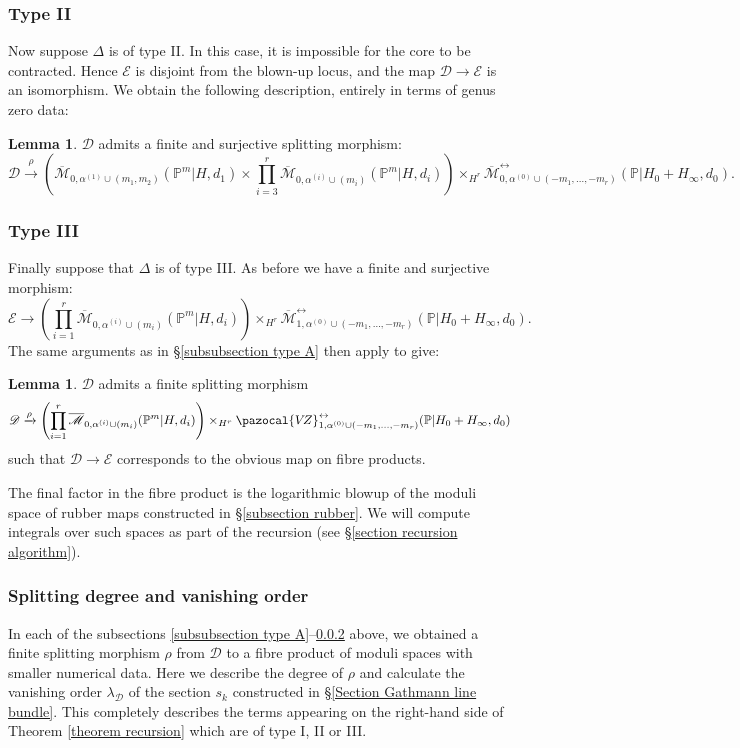 \documentclass[11pt]{amsart}
\newcommand{\PP}{\mathbb P}
\newcommand{\VZ}{\pazocal{V\!Z}}
\renewcommand{\to}{\rightarrow}
\newcommand{\Mcal}{\mathcal{M}}
\newcommand{\Dcal}{\mathcal{D}}
\newcommand{\Ecal}{\mathcal{E}}
\newcommand{\ol}[1]{\overline{#1}}
\theoremstyle{definition}
\newtheorem{lemma}[thm]{Lemma}
\theoremstyle{definition}
\begin{document}
\subsubsection{Type II}
Now suppose $\Delta$ is of type II. In this case, it is impossible for the core to be contracted. Hence $\Ecal$ is disjoint from the blown-up locus, and the map $\Dcal \to \Ecal$ is an isomorphism. We obtain the following description, entirely in terms of genus zero data:
\begin{lemma} $\Dcal$ admits a finite and surjective splitting morphism:
\begin{equation*} \Dcal \xrightarrow{\rho} \left(\ol\Mcal_{0,\alpha^{(1)}\cup(m_1,m_2)}(\PP^m|H,d_1)\times\prod_{i=3}^r \ol\Mcal_{0,\alpha^{(i)}\cup(m_i)}(\PP^m|H,d_i)\right) \times_{H^r} \ol\Mcal^{\leftrightarrow}_{0,\alpha^{(0)}\cup(-m_1,\ldots,-m_r)}(\mathbb P|H_0+H_\infty,d_0).\end{equation*}\end{lemma}

\subsubsection{Type III} \label{subsubsection type C+} Finally suppose that $\Delta$ is of type III. As before we have a finite and surjective morphism:
\begin{equation*} \Ecal \to  \left( \prod_{i=1}^r \ol\Mcal_{0,\alpha^{(i)}\cup(m_i)}(\PP^m|H,d_i) \right) \times_{H^r} \ol\Mcal^{\leftrightarrow}_{1,\alpha^{(0)}\cup(-m_1,\ldots,-m_r)}(\mathbb{P}|H_0+H_\infty,d_0). \end{equation*}
The same arguments as in \S \ref{subsubsection type A} then apply to give:
\begin{lemma} $\Dcal$ admits a finite splitting morphism
\begin{equation*}\Dcal \xrightarrow{\rho} \left( \prod_{i=1}^r \ol\Mcal_{0,\alpha^{(i)}\cup(m_i)}(\PP^m|H,d_i) \right) \times_{H^r} \VZ^{\leftrightarrow}_{1,\alpha^{(0)}\cup(-m_1,\ldots,-m_r)}(\mathbb{P}|H_0+H_\infty,d_0)\end{equation*}
such that $\Dcal \to \Ecal$ corresponds to the obvious map on fibre products.\end{lemma}
\noindent The final factor in the fibre product is the logarithmic blowup of the moduli space of rubber maps constructed in \S \ref{subsection rubber}. We will compute integrals over such spaces as part of the recursion (see \S \ref{section recursion algorithm}).

\subsubsection{Splitting degree and vanishing order} \label{subsubsection splitting degree} In each of the subsections \ref{subsubsection type A}--\ref{subsubsection type C+} above, we obtained a finite splitting morphism $\rho$ from $\Dcal$ to a fibre product of moduli spaces with smaller numerical data. Here we describe the degree of $\rho$ and calculate the vanishing order $\lambda_\Dcal$ of the section $s_k$ constructed in \S \ref{Section Gathmann line bundle}. This completely describes the terms appearing on the right-hand side of Theorem \ref{theorem recursion} which are of type I, II or III.
\end{document}
